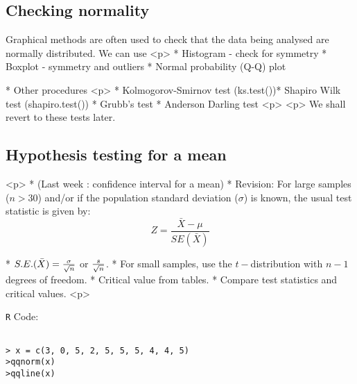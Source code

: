 \subsection{Checking normality}


Graphical methods are often used to check that the data being
analysed are normally distributed. We can use
<p>
*  Histogram - check for symmetry *  Boxplot - symmetry and
outliers *  Normal probability (Q-Q) plot

*  Other procedures
<p>
*  Kolmogorov-Smirnov test (ks.test())*  Shapiro Wilk test (shapiro.test()) * 
Grubb's test *  Anderson Darling test
<p>
<p>
We shall revert to these tests later.
%


\subsection{Hypothesis testing for a mean}

<p>
*  (Last week : confidence interval for a mean) *  Revision:
For large samples ($n > 30$) and/or if the population standard
deviation ($\sigma$) is known, the usual test statistic is given
by: \[Z =\frac{\bar{X} - \mu}{SE(\bar{X})}\]

*  $S.E.(\bar{X}) = { \sigma \over \sqrt{n}} $ or ${s \over \sqrt{n}}$. *  For small samples, use the $t-$distribution
with $n-1$ degrees of freedom.
* 
Critical value from tables.
*  Compare test statistics and critical values.
<p>


\texttt{R} Code:
\begin{verbatim}

> x = c(3, 0, 5, 2, 5, 5, 5, 4, 4, 5)
>qqnorm(x)
>qqline(x)

\end{verbatim}

%



